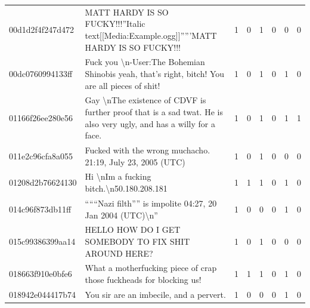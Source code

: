 \begin{table}[htb!]
{\begin{minipage}{0.88\textheight}
\begin{threeparttable}
\begin{tabularx}{\textwidth}{L{0.95} L{6.25} C{0.135} C{0.135} C{0.135} C{0.135} C{0.135} C{0.135}}
                    00d1d2f4f247d472 & MATT HARDY IS SO FUCKY!!!''Italic text[[Media:Example.ogg]]'''''MATT HARDY IS SO FUCKY!!!                                        & 1           & 0           & 1           & 0           & 0           & 0           \\
                    00dc0760994133ff & Fuck you \textbackslash n-User:The Bohemian Shinobis yeah, that's right, bitch! You are all pieces of shit!                      & 1           & 0           & 1           & 0           & 1           & 0           \\
                    01166f26ee280e56 & Gay \textbackslash nThe existence of CDVF is further proof that is a sad twat. He is also very ugly, and has a willy for a face. & 1           & 0           & 1           & 0           & 1           & 1           \\
                    011e2c96cfa8a055 & Fucked with the wrong muchacho. 21:19, July 23, 2005 (UTC)                                                                       & 1           & 0           & 1           & 0           & 0           & 0           \\
                    01208d2b76624130 & Hi \textbackslash nIm a fucking bitch.\textbackslash n50.180.208.181                                                             & 1           & 1           & 1           & 0           & 1           & 0           \\
                    014c96f873db11ff & ``````Nazi filth'''' is impolite 04:27, 20 Jan 2004 (UTC)\textbackslash n''                                                      & 1           & 0           & 0           & 0           & 1           & 0           \\
                    015c99386399aa14 & HELLO HOW DO I GET SOMEBODY TO FIX SHIT AROUND HERE?                                                                             & 1           & 0           & 1           & 0           & 0           & 0           \\
                    018663f910e0bfe6 & What a motherfucking piece of crap those fuckheads for blocking us!                                                              & 1           & 1           & 1           & 0           & 1           & 0           \\
                    018942e044417b74 & You sir are an imbecile, and a pervert.                                                                                          & 1           & 0           & 0           & 0           & 1           & 0           \\

\end{tabularx}
\end{threeparttable}
\end{minipage}}
\end{table}

